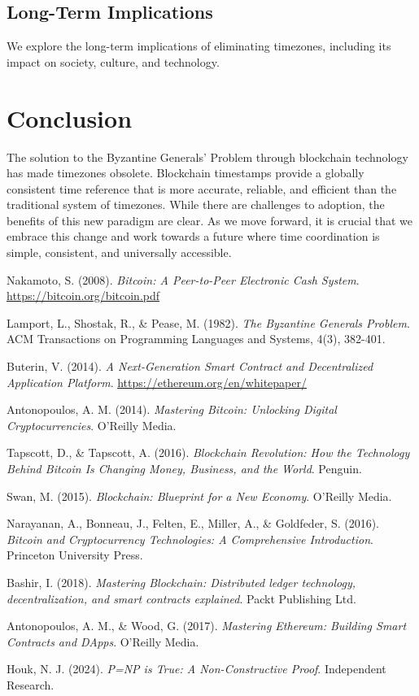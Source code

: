 \documentclass[12pt]{report}
\begin{document}
\section{Long-Term Implications}
We explore the long-term implications of eliminating timezones, including its impact on society, culture, and technology.

\chapter{Conclusion}

The solution to the Byzantine Generals' Problem through blockchain technology has made timezones obsolete. Blockchain timestamps provide a globally consistent time reference that is more accurate, reliable, and efficient than the traditional system of timezones. While there are challenges to adoption, the benefits of this new paradigm are clear. As we move forward, it is crucial that we embrace this change and work towards a future where time coordination is simple, consistent, and universally accessible.

\begin{thebibliography}{9}

Nakamoto, S. (2008). \textit{Bitcoin: A Peer-to-Peer Electronic Cash System}. \url{https://bitcoin.org/bitcoin.pdf}

Lamport, L., Shostak, R., \& Pease, M. (1982). \textit{The Byzantine Generals Problem}. ACM Transactions on Programming Languages and Systems, 4(3), 382-401.

Buterin, V. (2014). \textit{A Next-Generation Smart Contract and Decentralized Application Platform}. \url{https://ethereum.org/en/whitepaper/}

Antonopoulos, A. M. (2014). \textit{Mastering Bitcoin: Unlocking Digital Cryptocurrencies}. O'Reilly Media.

Tapscott, D., \& Tapscott, A. (2016). \textit{Blockchain Revolution: How the Technology Behind Bitcoin Is Changing Money, Business, and the World}. Penguin.

Swan, M. (2015). \textit{Blockchain: Blueprint for a New Economy}. O'Reilly Media.

Narayanan, A., Bonneau, J., Felten, E., Miller, A., \& Goldfeder, S. (2016). \textit{Bitcoin and Cryptocurrency Technologies: A Comprehensive Introduction}. Princeton University Press.

Bashir, I. (2018). \textit{Mastering Blockchain: Distributed ledger technology, decentralization, and smart contracts explained}. Packt Publishing Ltd.

Antonopoulos, A. M., \& Wood, G. (2017). \textit{Mastering Ethereum: Building Smart Contracts and DApps}. O'Reilly Media.

Houk, N. J. (2024). \textit{P=NP is True: A Non-Constructive Proof}. Independent Research.

\end{thebibliography}
\end{document}
